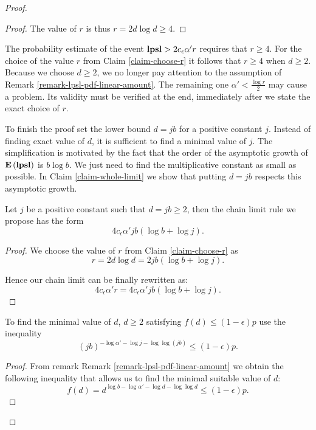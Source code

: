 \begin{proof}
\begin{proof}
The value of $r$ is thus $r = 2d \log d \geq 4$.
\end{proof}

The probability estimate of the event $\mathbf{lpsl} > 2 c_\epsilon \alpha' r$ requires that $r \geq 4$. For the choice of the value $r$ from Claim \ref{claim-choose-r} it follows that $r \geq 4$ when $d \geq 2$. Because we choose $d \geq 2$, we no longer pay attention to the assumption of Remark \ref{remark-lpsl-pdf-linear-amount}. The remaining one $\alpha' < \frac{\log r}{2}$ may cause a problem. Its validity must be verified at the end, immediately after we state the exact choice of $r$.

To finish the proof set the lower bound $d = j b$ for a positive constant $j$. Instead of finding exact value of $d$, it is sufficient to find a minimal value of $j$. The simplification is motivated by the fact that the order of the asymptotic growth of $\mathbf{E}\left(\mathbf{lpsl}\right)$ is $b \log b$. We just need to find the multiplicative constant as small as possible. In Claim \ref{claim-whole-limit} we show that putting $d = jb$ respects this asymptotic growth.

\begin{claim}
\label{claim-whole-limit}
Let $j$ be a positive constant such that $d = jb \geq 2 $, then the chain limit rule we propose has the form \[ 4 c_\epsilon \alpha' j b (\log b + \log j) \text{.} \]
\end{claim}
\begin{proof}
We choose the value of $r$ from Claim \ref{claim-choose-r} as
\[
	r = 2 d \log d = 2 j b (\log b + \log j) \text{.}
\]

Hence our chain limit can be finally rewritten as:
\[
	4 c_\epsilon \alpha' r = 4 c_\epsilon \alpha' j b (\log b + \log j) \text{.}
\]
\end{proof}

\begin{claim}
To find the minimal value of $d$, $d \geq 2$ satisfying $f(d) \leq (1 - \epsilon) p$ use the inequality
\begin{equation}
\label{inequality-formula-j}
	\left(j b\right)^{-\log \alpha' -\log j - \log \log (j b)} \leq (1 - \epsilon)p \text{.}
\end{equation}
\end{claim}
\begin{proof}
From remark Remark \ref{remark-lpsl-pdf-linear-amount} we obtain the following inequality that allows us to find the minimal suitable value of $d$:
\[
	f(d) = d ^ {\log b - \log \alpha' - \log d - \log \log d} \leq (1 - \epsilon) p \text{.}
\]


\end{proof}
\end{proof}
